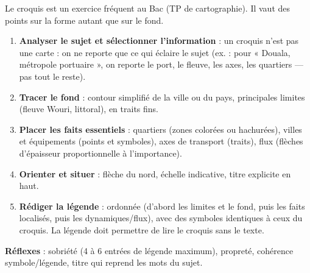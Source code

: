 \documentclass[11pt]{article}
\begin{document}
\begin{methode}
Le croquis est un exercice fréquent au Bac (TP de cartographie). Il vaut des points sur la forme autant que sur le fond.
\begin{enumerate}
\item \textbf{Analyser le sujet et sélectionner l'information} : un croquis n'est pas une carte : on ne reporte que ce qui éclaire le sujet (ex. : pour « Douala, métropole portuaire », on reporte le port, le fleuve, les axes, les quartiers — pas tout le reste).
\item \textbf{Tracer le fond} : contour simplifié de la ville ou du pays, principales limites (fleuve Wouri, littoral), en traits fins.
\item \textbf{Placer les faits essentiels} : quartiers (zones colorées ou hachurées), villes et équipements (points et symboles), axes de transport (traits), flux (flèches d'épaisseur proportionnelle à l'importance).
\item \textbf{Orienter et situer} : flèche du nord, échelle indicative, titre explicite en haut.
\item \textbf{Rédiger la légende} : ordonnée (d'abord les limites et le fond, puis les faits localisés, puis les dynamiques/flux), avec des symboles identiques à ceux du croquis. La légende doit permettre de lire le croquis sans le texte.
\end{enumerate}
\textbf{Réflexes} : sobriété (4 à 6 entrées de légende maximum), propreté, cohérence symbole/légende, titre qui reprend les mots du sujet.
\end{methode}
\end{document}
